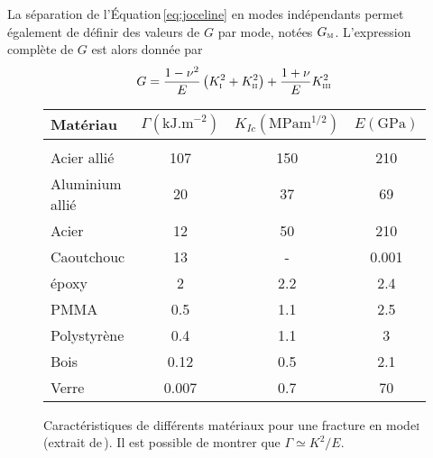 La séparation de l'Équation\,\ref{eq:joceline} en modes indépendants permet également de définir des valeurs de $G$ par mode, notées $G_\textsc{m}$. L'expression complète de $G$ est alors donnée par
\begin{equation}
G=\frac{1-\nu^2}{E}\left(K_\textsc{i}^2+K_\textsc{ii}^2\right) + \frac{1+\nu}{E}K_\textsc{iii}^2
\end{equation}






\begin{figure}[p]
\centering
\begin{tabular}{lccc}
Matériau & $\Gamma\left(\mathrm{kJ.m}^{-2}\right)$ & $K_{I c}\left(\unit{\mega\pascal\meter\tothe{1/2}}\right)$ & $E(\mathrm{GPa})$ \\
\hline & & & \\
Acier allié & 107 & 150 & 210 \\
Aluminium allié & 20 & 37 & 69 \\
Acier & 12 & 50 & 210 \\
Caoutchouc & 13 & - & 0.001 \\
époxy & 2 & 2.2 & 2.4 \\
PMMA & 0.5 & 1.1 & 2.5 \\
Polystyrène & 0.4 & 1.1 & 3 \\
Bois & 0.12 & 0.5 & 2.1 \\
Verre & 0.007 & 0.7 & 70 \\
\hline
\end{tabular}
\caption[Caractéristiques de différents matériaux]{Caractéristiques de différents matériaux pour une fracture en mode\:\textsc{i} (extrait de\,\cite{ohring_engineering_1995}). Il est possible de montrer que $\Gamma\simeq K^2/E$.}
\label{tab:caracmater}
\end{figure}


